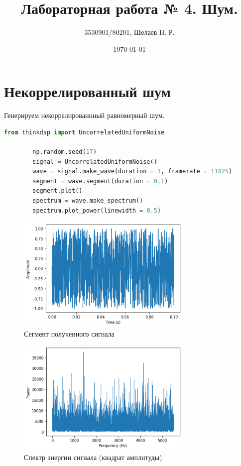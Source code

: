 \documentclass[a4paper, 12pt]{report}
\author{3530901/80201, Шелаев Н. Р.}
\title{Лабораторная работа № 4. Шум.}
\date{\today}
\begin{document}
	\maketitle
	\tableofcontents
	\listoffigures
	\lstlistoflistings

	\chapter{Некоррелированный шум}
	Генерируем некоррелированнный равномерный шум.
	\begin{lstlisting}[language=Python,caption=Строим и исследуем некоррелированный шум]
		from thinkdsp import UncorrelatedUniformNoise
		
		np.random.seed(17)
		signal = UncorrelatedUniformNoise()
		wave = signal.make_wave(duration = 1, framerate = 11025)
		segment = wave.segment(duration = 0.1)
		segment.plot()
		spectrum = wave.make_spectrum()
		spectrum.plot_power(linewidth = 0.5)
	\end{lstlisting}
	\begin{figure}[H]
		\centering
		\includegraphics[width=0.75\textwidth]{uun1.png}
		\caption{Сегмент полученного сигнала}
		\label{fig:uun1}
	\end{figure}
	\begin{figure}[H]
		\centering
		\includegraphics[width=0.75\textwidth]{uun2.png}
		\caption{Спектр энергии сигнала (квадрат амплитуды)}
		\label{fig:uun2}
	\end{figure}
\end{document}
